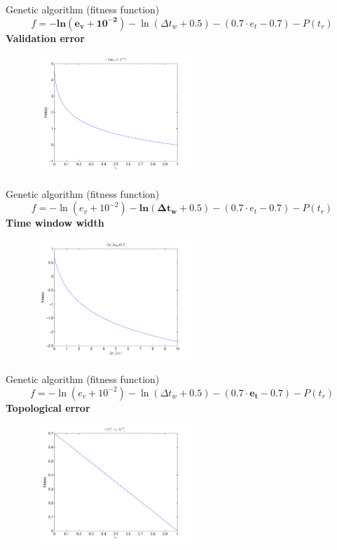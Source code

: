 \documentclass{beamer}
\begin{document}
\begin{frame}{Genetic algorithm (fitness function)}
	\[ f = \mathbf{-ln(e_v+10^{-2 })} - \ln(\Delta t_w+0.5) - (0.7\cdot e_t-0.7) - P(t_r) \]
	\centering
	\textbf{Validation error}
	\begin{figure}[h] %
		\includegraphics[width=60mm]{fit_ev}
		\label{fit_ev}
	\end{figure}
\end{frame}


\begin{frame}{Genetic algorithm (fitness function)}
	\[ f = -\ln(e_v+10^{-2 }) - \mathbf{ln(\Delta t_w+0.5)} - (0.7\cdot e_t-0.7) - P(t_r) \]
	\centering
	\textbf{Time window width}
	\begin{figure}[h] %
		\includegraphics[width=60mm]{fit_tw}
		\label{fit_tw}
	\end{figure}
\end{frame}

\begin{frame}{Genetic algorithm (fitness function)}
	\[ f = -\ln(e_v+10^{-2 }) - \ln(\Delta t_w+0.5) - \mathbf{(0.7\cdot e_t-0.7)} - P(t_r) \]
	\centering
	\textbf{Topological error}
	\begin{figure}[h] %
		\includegraphics[width=60mm]{fit_et}
		\label{fit_et}
	\end{figure}
\end{frame}
\end{document}
